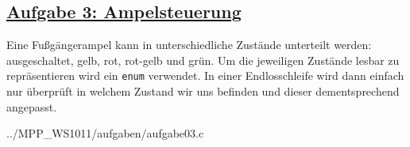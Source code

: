 \subsection{
\href{http://cst.mi.fu-berlin.de/intern/19606-P-MPP/Aufgaben/040103.html}
{Aufgabe 3: Ampelsteuerung}}
Eine Fußgängerampel kann in unterschiedliche Zustände unterteilt werden: ausgeschaltet, gelb, rot, rot-gelb und grün.
Um die jeweiligen Zustände lesbar zu repräsentieren wird ein \texttt{enum} verwendet.
In einer Endlosschleife wird dann einfach nur überprüft in welchem Zustand wir uns befinden und dieser dementsprechend angepasst.

{../MPP_WS1011/aufgaben/aufgabe03.c}

